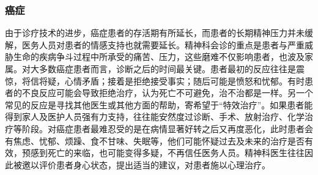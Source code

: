 \subsubsection{癌症}

由于诊疗技术的进步，癌症患者的存活期有所延长，而患者的长期精神压力并未缓解，医务人员对患者的情感支持也就需要延长。精神科会诊的重点是患者与严重威胁生命的疾病争斗过程中所承受的痛苦、压力，这些磨难不仅影响患者，也波及家属。对大多数癌症患者而言，诊断之后的时间最关键。患者最初的反应往往是震惊，将信将疑，心情矛盾；接着是拒绝接受事实；随后可能是愤怒和忧郁。有时患者的不良反应可能会导致拒绝治疗，认为死亡不可避免，治不治都是一样。另一个常见的反应是寻找其他医生或其他方面的帮助，寄希望于``特效治疗''。如果患者能得到家人及医护人员强有力支持，往往能安然度过诊断、手术、放射治疗、化学治疗等阶段。对癌症患者最难忍受的是在病情显著好转之后又再度恶化，此时患者会有焦虑、忧郁、烦躁、食不甘味、失眠等，他们可能怀疑过去及未来的治疗是否有效，预感到死亡的来临，也可能变得多疑，不再信任医务人员。精神科医生往往因此被邀以评价患者身心状态，提出适当的建议，对患者施以心理治疗。